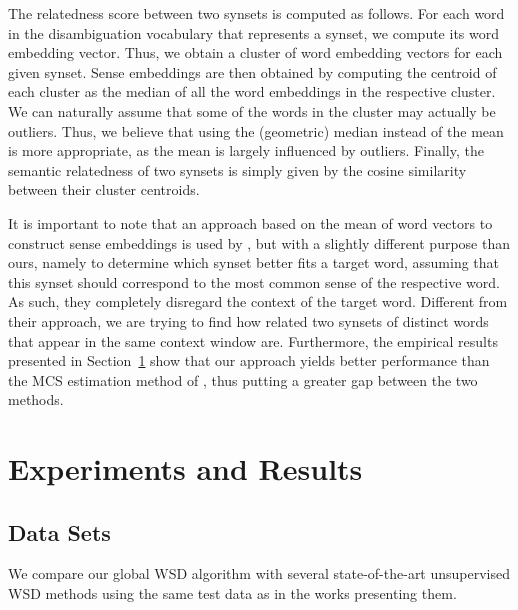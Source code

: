 \documentclass[11pt]{article}
\begin{document}
The relatedness score between two synsets is computed as follows. For each word in the disambiguation vocabulary that represents a synset, we compute its word embedding vector. Thus, we obtain a cluster of word embedding vectors for each given synset. Sense embeddings are then obtained by computing the centroid of each cluster as the median of all the word embeddings in the respective cluster. We can naturally assume that some of the words in the cluster may actually be outliers. Thus, we believe that using the (geometric) median instead of the mean is more appropriate, as the mean is largely influenced by outliers. Finally, the semantic relatedness of two synsets is simply given by the cosine similarity between their cluster centroids.


It is important to note that an approach based on the mean of word vectors to construct sense embeddings is used by , but with a slightly different purpose than ours, namely to determine which synset better fits a target word, assuming that this synset should correspond to the most common sense of the respective word. As such, they completely disregard the context of the target word. Different from their approach, we are trying to find how related two synsets of distinct words that appear in the same context window are. Furthermore, the empirical results presented in Section~\ref{sec_Experiments} show that our approach yields better performance than the MCS estimation method of , thus putting a greater gap between the two methods.

\section{Experiments and Results}
\label{sec_Experiments}

\subsection{Data Sets}

We compare our global WSD algorithm with several state-of-the-art unsupervised WSD methods using the same test data as in the works presenting them. 
\end{document}
